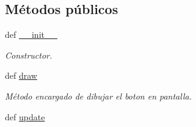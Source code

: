 \subsection*{\-Métodos públicos}
\begin{DoxyCompactItemize}
\item 
def \hyperlink{classengine_1_1button_1_1Button_a75c11fc8372f1d194d073fd1e7a078c5}{\-\_\-\-\_\-init\-\_\-\-\_\-}
\begin{DoxyCompactList}\small\item\em \-Constructor. \end{DoxyCompactList}\item 
def \hyperlink{classengine_1_1button_1_1Button_af3d2a02a9c8650f9114485aaa4fb961a}{draw}
\begin{DoxyCompactList}\small\item\em \-Método encargado de dibujar el boton en pantalla. \end{DoxyCompactList}\item 
\hypertarget{classengine_1_1button_1_1Button_a2b40fffc9e589cfc74fcd97dbba39f53}{
def \hyperlink{classengine_1_1button_1_1Button_a2b40fffc9e589cfc74fcd97dbba39f53}{update}}
\label{classengine_1_1button_1_1Button_a2b40fffc9e589cfc74fcd97dbba39f53}


\end{DoxyCompactItemize}

